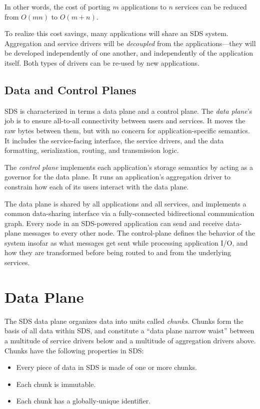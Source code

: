 In other words, the cost of porting $m$ applications to $n$ services can be
reduced from $O(mn)$ to $O(m+n)$.

To realize this cost savings, many applications will share an SDS system.  Aggregation and service drivers
will be \emph{decoupled} from the applications---they will be
developed independently of one another, and independently of the
application itself.  Both types of drivers can be re-used by new applications.

\subsection{Data and Control Planes}

SDS is characterized in terms a data plane and a control plane.
The \emph{data plane}'s job
is to ensure all-to-all connectivity between users and services.
It moves the raw bytes between them, but with no concern for
application-specific semantics.  It includes the service-facing interface, the
service drivers, and the data formatting, serialization, routing, and transmission
logic.

The \emph{control plane} implements each application's
storage semantics by acting as a governor for the data plane.
It runs an application's aggregation driver 
to constrain how each of its users interact with the data plane.

The data plane is shared by all applications and all services, and implements a
common data-sharing interface via a fully-connected bidirectional communication graph.
Every node in an SDS-powered application can send and receive data-plane
messages to every other node.  The control-plane defines the behavior of the
system insofar as what messages get sent while processing application I/O, and how they are
transformed before being routed to and from the underlying services.

\section{Data Plane}

The SDS data plane organizes data into units called \emph{chunks}.  Chunks form
the basis of all data within SDS, and constitute a ``data plane narrow waist'' between 
a multitude of service drivers below and a multitude of aggregation drivers
above.  Chunks have the following properties in SDS:

\begin{itemize}
    \item Every piece of data in SDS is made of one or more chunks.
    \item Each chunk is immutable.
    \item Each chunk has a globally-unique identifier.
\end{itemize}

